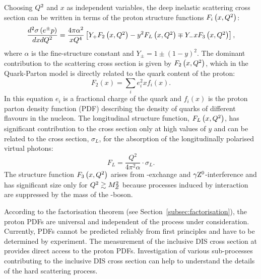 Choosing $\mbox{${Q^2}$}$ and $x$ as independent variables, the deep inelastic scattering cross section can be written in terms of the proton structure functions $F_i\left(x,\mbox{${Q^2}$}\right)$:
\begin{equation}
\frac{d^2\sigma\left( e^\pm p \right) }{dxd\mbox{${Q^2}$}} = \frac{4\pi\alpha^2}{xQ^4}\left[ Y_+F_2\left(x,\mbox{${Q^2}$}\right) - y^2F_L\left(x,\mbox{${Q^2}$}\right) \mp Y_-xF_3\left(x,\mbox{${Q^2}$}\right) \right],
\label{eq:ddifDIS}
\end{equation}
where $\alpha$ is the fine-structure constant and $Y_\pm = 1 \pm \left( 1 - y \right)^2$. The dominant contribution to the scattering cross section is given by $F_2\left(x,\mbox{${Q^2}$}\right)$, which in the Quark-Parton model is directly related to the quark content of the proton:
\begin{equation}
F_2\left(x\right) = \sum_i{e_i^2xf_i\left(x\right)}.
\label{eq:f2pdf}
\end{equation}
In this equation $e_i$ is a fractional charge of the quark and $f_i\left(x\right)$ is the proton parton density function (PDF) describing the density of quarks of different flavours in the nucleon. The longitudinal structure function, $F_L\left(x,\mbox{${Q^2}$}\right)$, has significant contribution to the cross section only at high values of $y$ and can be related to the cross section, $\sigma_L$, for the absorption of the longitudinally polarised virtual photons:
\begin{equation}
F_L = \frac{Q^2}{4\pi^2\alpha}\cdot \sigma_L.
\label{eq:sigmal}
\end{equation}
The structure function $F_3\left(x,\mbox{${Q^2}$}\right)$ arises from \zn-exchange and $\gamma\mbox{$\rm{Z}^0$}$-interference and has significant size only for $\mbox{${Q^2}$} \gtrsim M^2_Z$ because processes induced by \zn interaction are suppressed by the mass of the \zn-boson.

According to the factorisation theorem (see Section~\ref{subsec:factorisation}), the proton PDFs are universal and independent of the process under consideration. Currently, PDFs cannot be predicted reliably from first principles and have to be determined by experiment. The measurement of the inclusive DIS cross section at \hera provides direct access to the proton PDFs. Investigation of various sub-processes contributing to the inclusive DIS cross section can help to understand the details of the hard scattering process.
